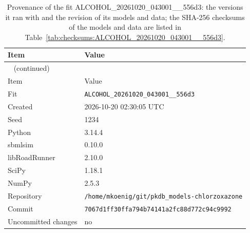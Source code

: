 \documentclass{article}
\begin{document}
\begin{longtable}{ll}
\caption{Provenance of the fit ALCOHOL\_20261020\_043001\_\_556d3: the versions it ran with and the revision of its models and data; the SHA-256 checksums of the models and data are listed in Table~\ref{tab:checksums:ALCOHOL_20261020_043001__556d3}.}\label{tab:provenance:ALCOHOL_20261020_043001__556d3} \\
\toprule
Item & Value \\
\midrule
\endfirsthead
\multicolumn{2}{l}{\small\tablename~\thetable{} (continued)} \\
\toprule
Item & Value \\
\midrule
\endhead
\bottomrule
\endlastfoot
Fit & \texttt{ALCOHOL\_20261020\_043001\_\_556d3} \\
Created & 2026-10-20 02:30:05 UTC \\
Seed & 1234 \\
Python & 3.14.4 \\
sbmlsim & 0.10.0 \\
libRoadRunner & 2.10.0 \\
SciPy & 1.18.1 \\
NumPy & 2.5.3 \\
Repository & \texttt{/home/mkoenig/git/pkdb\_models-chlorzoxazone} \\
Commit & \texttt{7067d1ff30ffa794b74141a2fc88d772c94c9992} \\
Uncommitted changes & no \\
\end{longtable}



\end{document}

